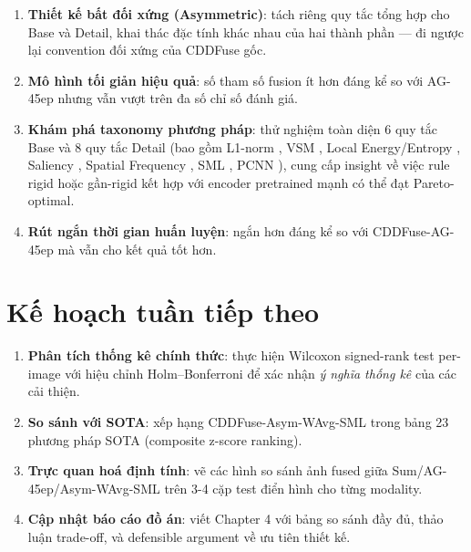 \documentclass[12pt,a4paper]{article}
\begin{document}
\begin{enumerate}\itemsep0pt
    \item \textbf{Thiết kế bất đối xứng (Asymmetric)}: tách riêng quy tắc tổng hợp cho Base và Detail, khai thác đặc tính khác nhau của hai thành phần --- đi ngược lại convention đối xứng của CDDFuse gốc.
    \item \textbf{Mô hình tối giản hiệu quả}: số tham số fusion ít hơn đáng kể so với AG-45ep nhưng vẫn vượt trên đa số chỉ số đánh giá.
    \item \textbf{Khám phá taxonomy phương pháp}: thử nghiệm toàn diện 6 quy tắc Base và 8 quy tắc Detail (bao gồm L1-norm \cite{li2018densefuse}, VSM \cite{wang2008vsm}, Local Energy/Entropy \cite{liu2018survey}, Saliency \cite{liu2016saliency}, Spatial Frequency \cite{eskicioglu1995sf}, SML \cite{huang2007sml}, PCNN \cite{eckhorn1990pcnn, yin2019papcnn}), cung cấp insight về việc rule rigid hoặc gần-rigid kết hợp với encoder pretrained mạnh có thể đạt Pareto-optimal.
    \item \textbf{Rút ngắn thời gian huấn luyện}: ngắn hơn đáng kể so với CDDFuse-AG-45ep mà vẫn cho kết quả tốt hơn.
\end{enumerate}

\section{Kế hoạch tuần tiếp theo}

\begin{enumerate}\itemsep0pt
    \item \textbf{Phân tích thống kê chính thức}: thực hiện Wilcoxon signed-rank test \cite{wilcoxon1945} per-image với hiệu chỉnh Holm--Bonferroni \cite{holm1979} để xác nhận \emph{ý nghĩa thống kê} của các cải thiện.
    \item \textbf{So sánh với SOTA}: xếp hạng CDDFuse-Asym-WAvg-SML trong bảng 23 phương pháp SOTA (composite z-score ranking).
    \item \textbf{Trực quan hoá định tính}: vẽ các hình so sánh ảnh fused giữa Sum/AG-45ep/Asym-WAvg-SML trên 3-4 cặp test điển hình cho từng modality.
    \item \textbf{Cập nhật báo cáo đồ án}: viết Chapter 4 với bảng so sánh đầy đủ, thảo luận trade-off, và defensible argument về ưu tiên thiết kế.
\end{enumerate}
\end{document}
